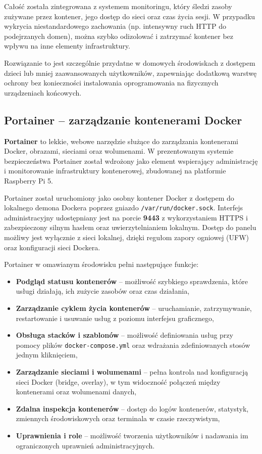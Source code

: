 \documentclass[
    left=2.5cm,         %
    right=2.5cm,        %
    top=2.5cm,          %
    bottom=3cm,         %
    bindingoffset=6mm,  %
    nohyphenation=true %
]{eiti/eiti-thesis} %
\begin{document}
Całość została zintegrowana z systemem monitoringu, który śledzi zasoby zużywane przez kontener, jego dostęp do sieci oraz czas życia sesji. W przypadku wykrycia niestandardowego zachowania (np. intensywny ruch HTTP do podejrzanych domen), można szybko odizolować i zatrzymać kontener bez wpływu na inne elementy infrastruktury.

Rozwiązanie to jest szczególnie przydatne w domowych środowiskach z dostępem dzieci lub mniej zaawansowanych użytkowników, zapewniając dodatkową warstwę ochrony bez konieczności instalowania oprogramowania na fizycznych urządzeniach końcowych.


\subsection{Portainer – zarządzanie kontenerami Docker}

\textbf{Portainer}\cite{portainer-docs} to lekkie, webowe narzędzie służące do zarządzania kontenerami Docker, obrazami, sieciami oraz wolumenami. W prezentowanym systemie bezpieczeństwa Portainer został wdrożony jako element wspierający administrację i monitorowanie infrastruktury kontenerowej, zbudowanej na platformie Raspberry Pi 5.

Portainer został uruchomiony jako osobny kontener Docker z dostępem do lokalnego demona Dockera poprzez gniazdo \texttt{/var/run/docker.sock}. Interfejs administracyjny udostępniany jest na porcie \textbf{9443} z wykorzystaniem HTTPS i zabezpieczony silnym hasłem oraz uwierzytelnianiem lokalnym. Dostęp do panelu możliwy jest wyłącznie z sieci lokalnej, dzięki regułom zapory ogniowej (UFW) oraz konfiguracji sieci Dockera.

Portainer w omawianym środowisku pełni następujące funkcje:
\begin{itemize}
    \item \textbf{Podgląd statusu kontenerów} – możliwość szybkiego sprawdzenia, które usługi działają, ich zużycie zasobów oraz czas działania,
    \item \textbf{Zarządzanie cyklem życia kontenerów} – uruchamianie, zatrzymywanie, restartowanie i usuwanie usług z poziomu interfejsu graficznego,
    \item \textbf{Obsługa stacków i szablonów} – możliwość definiowania usług przy pomocy plików \texttt{docker-compose.yml} oraz wdrażania zdefiniowanych stosów jednym kliknięciem,
    \item \textbf{Zarządzanie sieciami i wolumenami} – pełna kontrola nad konfiguracją sieci Docker (bridge, overlay), w tym widoczność połączeń między kontenerami oraz wolumenami danych,
    \item \textbf{Zdalna inspekcja kontenerów} – dostęp do logów kontenerów, statystyk, zmiennych środowiskowych oraz terminala w czasie rzeczywistym,
    \item \textbf{Uprawnienia i role} – możliwość tworzenia użytkowników i nadawania im ograniczonych uprawnień administracyjnych.
\end{itemize}
\end{document}
